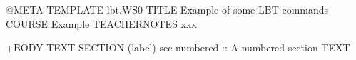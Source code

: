 \documentclass[a4paper,oneside,11pt]{memoir}
\begin{document}
\lbtDraftModeOff{}

\tableofcontents



\begin{lbt}
  @META
    TEMPLATE   lbt.WS0
    TITLE      Example of some LBT commands
    COURSE     Example
    TEACHERNOTES   xxx

  +BODY
  TEXT \kant[1]
  SECTION (label) sec-numbered :: A numbered section
  TEXT \kant[2-3]

\end{lbt}

\end{document}
